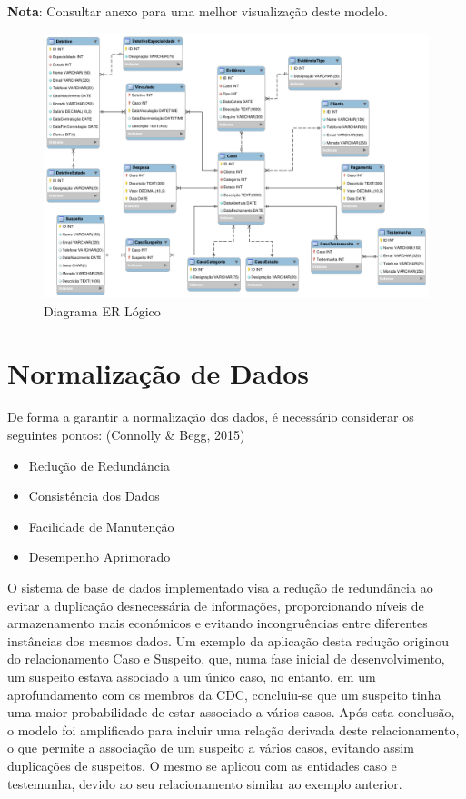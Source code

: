 \documentclass[a4paper,12pt]{scrreprt}
\begin{document}
    \textbf{Nota}: Consultar anexo \textit{} para uma melhor visualização deste modelo.
    \clearpage
    \begin{figure}[!ht]
        \centering
        \includegraphics[scale=0.70, angle=270]{images/logico.png}
        \caption{Diagrama ER Lógico}
        \label{fig:4.1}
    \end{figure}

    \clearpage
    \section{Normalização de Dados}
        De forma a garantir a normalização dos dados, é necessário considerar os seguintes pontos: \cite{DatabaseSystems} (Connolly \& Begg, 2015)
        \begin{itemize}
            \item Redução de Redundância
            \item Consistência dos Dados
            \item Facilidade de Manutenção
            \item Desempenho Aprimorado
        \end{itemize}
        O sistema de base de dados implementado visa a redução de redundância ao evitar a duplicação desnecessária de informações, proporcionando níveis de armazenamento mais económicos e evitando incongruências entre diferentes instâncias dos mesmos dados. Um exemplo da aplicação desta redução originou do relacionamento Caso e Suspeito, que, numa fase inicial de desenvolvimento, um suspeito estava associado a um único caso, no entanto, em um aprofundamento com os membros da CDC, concluiu-se que um suspeito tinha uma maior probabilidade de estar associado a vários casos. Após esta conclusão, o modelo foi amplificado para incluir uma relação derivada deste relacionamento, o que permite a associação de um suspeito a vários casos, evitando assim duplicações de suspeitos. O mesmo se aplicou com as entidades caso e testemunha, devido ao seu relacionamento similar ao exemplo anterior.
\end{document}
